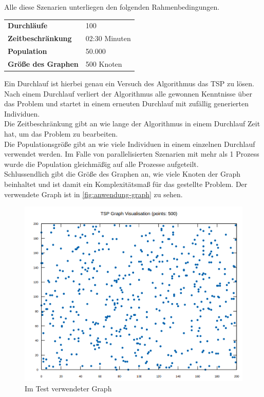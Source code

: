 \documentclass[12pt,a4paper]{scrreprt}
\begin{document}
Alle diese Szenarien unterliegen den folgenden Rahmenbedingungen.

\begin{longtable}{ p{5cm} p{7cm} }
\textbf{Durchläufe} & 100\\
\textbf{Zeitbeschränkung} & 02:30 Minuten\\
\textbf{Population} & 50.000\\
\textbf{Größe des Graphen} & 500 Knoten\\
\end{longtable}

Ein Durchlauf ist hierbei genau ein Versuch des Algorithmus das TSP zu lösen. Nach einem Durchlauf verliert der Algorithmus alle gewonnen Kenntnisse über das Problem und startet in einem erneuten Durchlauf mit zufällig generierten Individuen.\\
Die Zeitbeschränkung gibt an wie lange der Algorithmus in einem Durchlauf Zeit hat, um das Problem zu bearbeiten.\\
Die Populationsgröße gibt an wie viele Individuen in einem einzelnen Durchlauf verwendet werden. Im Falle von parallelisierten Szenarien mit mehr als 1 Prozess wurde die Population gleichmäßig auf alle Prozesse aufgeteilt.\\
Schlussendlich gibt die Größe des Graphen an, wie viele Knoten der Graph beinhaltet und ist damit ein Komplexitätsmaß für das gestellte Problem. Der verwendete Graph ist in \autoref{fig:anwendung-graph} zu sehen.

\begin{figure}[ht]
  	\centering
	\includegraphics[width=400pt]{images/graph_01.png}
	\caption{Im Test verwendeter Graph}
	\label{fig:anwendung-graph}
\end{figure}
\end{document}
